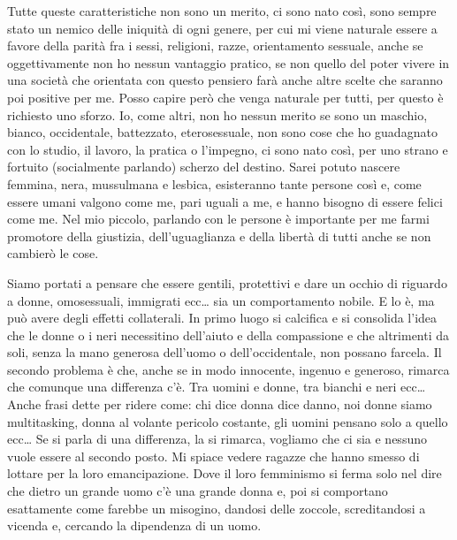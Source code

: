 \documentclass[12pt]{book} %
\begin{document}
Tutte queste caratteristiche non sono un merito, ci sono nato così, sono sempre stato un nemico delle iniquità di ogni
genere, per cui mi viene naturale essere a favore della parità fra i sessi, religioni, razze, orientamento sessuale,
anche se oggettivamente non ho nessun vantaggio pratico, se non quello del poter vivere in una società che orientata
con questo pensiero farà anche altre scelte che saranno poi positive per me. Posso capire però che venga naturale per
tutti, per questo è richiesto uno sforzo. Io, come altri, non ho nessun merito se sono un maschio, bianco, occidentale,
battezzato, eterosessuale, non sono cose che ho guadagnato con lo studio, il lavoro, la pratica o
l'impegno, ci sono nato così, per uno strano e fortuito (socialmente parlando) scherzo del
destino. Sarei potuto nascere femmina, nera, mussulmana e lesbica, esisteranno tante persone così e, come essere umani
valgono come me, pari uguali a me, e hanno bisogno di essere felici come me. Nel mio piccolo, parlando con le persone è
importante per me farmi promotore della giustizia, dell'uguaglianza e della libertà di tutti anche
se non cambierò le cose. 

Siamo portati a pensare che essere gentili, protettivi e dare un occhio di riguardo a donne, omosessuali, immigrati ecc…
sia un comportamento nobile. E lo è, ma può avere degli effetti collaterali. In primo luogo si calcifica e si consolida
l'idea che le donne o i neri necessitino dell'aiuto e della compassione e che
altrimenti da soli, senza la mano generosa dell'uomo o dell'occidentale, non
possano farcela. Il secondo problema è che, anche se in modo innocente, ingenuo e generoso, rimarca che comunque una
differenza c'è. Tra uomini e donne, tra bianchi e neri ecc… Anche frasi dette per ridere come: chi
dice donna dice danno, noi donne siamo multitasking, donna al volante pericolo costante, gli uomini pensano solo a
quello ecc… Se si parla di una differenza, la si rimarca, vogliamo che ci sia e nessuno vuole essere al secondo posto.
Mi spiace vedere ragazze che hanno smesso di lottare per la loro emancipazione. Dove il loro femminismo si ferma solo
nel dire che dietro un grande uomo c'è una grande donna e, poi si comportano esattamente come
farebbe un misogino, dandosi delle zoccole, screditandosi a vicenda e, cercando la dipendenza di un uomo.
\end{document}

